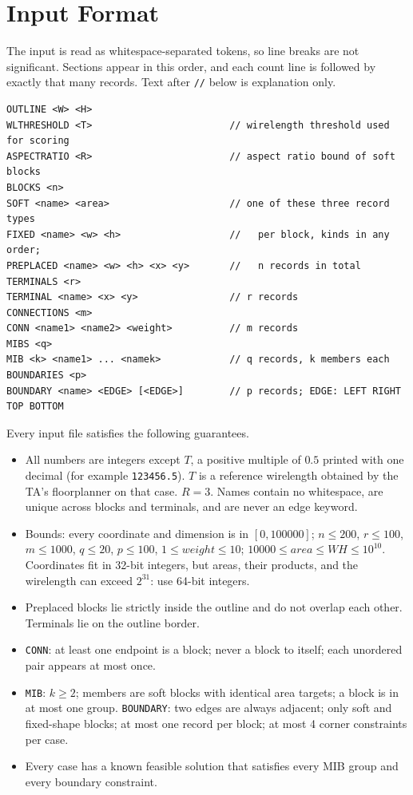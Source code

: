 \documentclass[11pt,a4paper]{article}
\newcommand{\kw}[1]{\texttt{#1}}
\begin{document}
\section{Input Format}

The input is read as whitespace-separated tokens, so line breaks are not
significant. Sections appear in this order, and each count line is followed by
exactly that many records. Text after \kw{//} below is explanation only.

\begin{Verbatim}[frame=single,fontsize=\small]
OUTLINE <W> <H>
WLTHRESHOLD <T>                        // wirelength threshold used for scoring
ASPECTRATIO <R>                        // aspect ratio bound of soft blocks
BLOCKS <n>
SOFT <name> <area>                     // one of these three record types
FIXED <name> <w> <h>                   //   per block, kinds in any order;
PREPLACED <name> <w> <h> <x> <y>       //   n records in total
TERMINALS <r>
TERMINAL <name> <x> <y>                // r records
CONNECTIONS <m>
CONN <name1> <name2> <weight>          // m records
MIBS <q>
MIB <k> <name1> ... <namek>            // q records, k members each
BOUNDARIES <p>
BOUNDARY <name> <EDGE> [<EDGE>]        // p records; EDGE: LEFT RIGHT TOP BOTTOM
\end{Verbatim}

Every input file satisfies the following guarantees.
\begin{itemize}
  \item All numbers are integers except $T$, a positive multiple of $0.5$
        printed with one decimal (for example \kw{123456.5}). $T$ is a
        reference wirelength obtained by the TA's floorplanner on that case.
        $R=3$. Names contain no whitespace, are unique across blocks and
        terminals, and are never an edge keyword.
  \item Bounds: every coordinate and dimension is in $[0,100000]$;
        $n\le200$, $r\le100$, $m\le1000$, $q\le20$, $p\le100$,
        $1\le\mathit{weight}\le10$; $10000\le\mathit{area}\le WH\le10^{10}$.
        Coordinates fit in 32-bit integers, but areas, their products, and the
        wirelength can exceed $2^{31}$: use 64-bit integers.
  \item Preplaced blocks lie strictly inside the outline and do not overlap
        each other. Terminals lie on the outline border.
  \item \kw{CONN}: at least one endpoint is a block; never a block to itself;
        each unordered pair appears at most once.
  \item \kw{MIB}: $k\ge2$; members are soft blocks with identical area
        targets; a block is in at most one group.
        \kw{BOUNDARY}: two edges are always adjacent; only soft and fixed-shape
        blocks; at most one record per block; at most 4 corner constraints per
        case.
  \item Every case has a known feasible solution that satisfies every MIB
        group and every boundary constraint.
\end{itemize}
\end{document}
